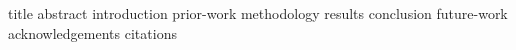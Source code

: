 \documentclass {journal}
\begin{document}
\def \JoDPagesTotal {30000}
\def \JoDPagesGoldStandard {15000}
\def \JoDCitationsTotal {11000}

 {title}
 {abstract}
 {introduction}
 {prior-work}
 {methodology}
 {results}
 {conclusion}
 {future-work}
 {acknowledgements}
 {citations}
\end{document}
